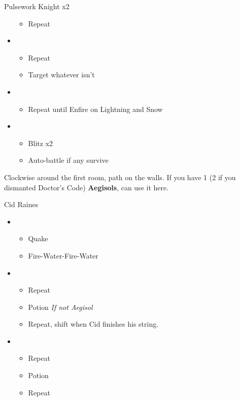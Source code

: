 \begin{paracol}{2}
\begin{battle}{Pulsework Knight x2}
\begin{itemize}
\begin{itemize}
        \item Repeat
    \end{itemize}
    \item \fourth
    \begin{itemize}
        \item Repeat
        \item Target whatever isn't \stagger
    \end{itemize}
    \item \fifth
    \begin{itemize}
        \item Repeat until Enfire on Lightning and Snow
    \end{itemize}
    \item \sixth
    \begin{itemize}
        \item Blitz x2
        \item Auto-battle if any survive
    \end{itemize}
\end{itemize}
\end{battle}
\switchcolumn*
	Clockwise around the first room, path on the walls.
	If you have 1 (2 if you dismanted Doctor's Code) \textbf{Aegisols}, can use it here.
	\begin{battle}{Cid Raines}
		\begin{itemize}
			\item \first
			      \begin{itemize}
				      \item Quake
				      \item Fire-Water-Fire-Water
			      \end{itemize}
			\item \third
			      \begin{itemize}
				      \item Repeat
				      \item Potion \textit{If not Aegisol}
				      \item Repeat, shift when Cid finishes his string.
			      \end{itemize}
			\item \fifth
			      \begin{itemize}
				      \item Repeat
				      \item Potion
				      \item Repeat

\end{itemize}
\end{itemize}
\end{battle}
\end{paracol}
